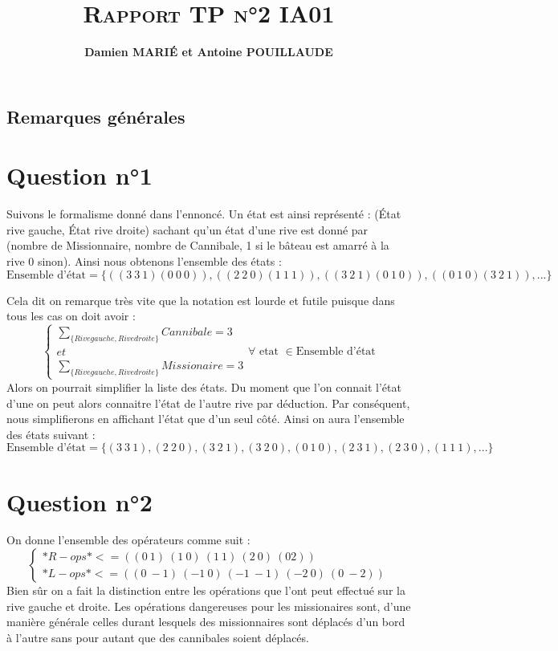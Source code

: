 \documentclass[a4paper, 12pt, leqno]{report}
\title{\textsc{\textbf{Rapport TP n°2 IA01}}}
\author{\textbf{Damien MARI\'E et Antoine POUILLAUDE}}
\theoremstyle{plain}
\begin{document}
    \maketitle
    \tableofcontents
\newpage
\section*{Remarques générales}
		
        \chapter{Question n°1}        
            Suivons le formalisme donné dans l'ennoncé. Un état est ainsi représenté : (État rive gauche, État rive droite) sachant qu'un état d'une rive est donné par (nombre de Missionnaire, nombre de Cannibale, 1 si le bâteau est amarré à la rive 0 sinon). Ainsi nous obtenons l'ensemble des états : 
            \[ \text{Ensemble d'état} = 
            \{ ((3\ 3\ 1) (0\ 0\ 0)),
            ((2\ 2\ 0) (1\ 1\ 1)),
            ((3\ 2\ 1) (0\ 1\ 0)),
            ((0\ 1\ 0) (3\ 2\ 1)),
            ...
            \}\]
            
    Cela dit on remarque très vite que la notation est lourde et futile puisque dans tous les cas on doit avoir : 
\[
          \left\{
    \begin{array}{ll}
        \sum_{\{Rive gauche,Rive droite\}}^{}Cannibale =3\\
        et\\
        \sum_{\{Rive gauche,Rive droite\}}^{}Missionaire = 3
    \end{array}
\right.
\forall \text{ etat } \in \text{Ensemble d'état}
\]
Alors on pourrait simplifier la liste des états. Du moment que l'on connait l'état d'une on peut alors connaitre l'état de l'autre rive par déduction. Par conséquent, nous simplifierons en affichant l'état que d'un seul côté. Ainsi on aura l'ensemble des états suivant :
\[ \text{Ensemble d'état} = 
            \{ (3\ 3\ 1),
            (2\ 2\ 0),
            (3\ 2\ 1),
            (3\ 2\ 0),
            (0\ 1\ 0),
            (2\ 3\ 1),
            (2\ 3\ 0),
            (1\ 1\ 1),
            ...
            \}\]

		\chapter{Question n°2}     
            On donne l'ensemble des opérateurs comme suit :
               $$
               \left\{
    \begin{array}{ll}
    *R-ops* <= ((0\ 1)\ (1\ 0)\ (1\ 1)\ (2\ 0)\ (0 2))\\     
                *L-ops* <= ((0\ -1)\ (-1\ 0)\ (-1\ -1)\ (-2\ 0)\ (0\ -2))
    \end{array}
    \right.
    $$
    Bien sûr on a fait la distinction entre les opérations que l'ont peut effectué sur la rive gauche et droite. Les opérations dangereuses pour les missionaires sont, d'une manière générale celles durant lesquels des missionnaires sont déplacés d'un bord à l'autre sans pour autant que des cannibales soient déplacés. 
        
\end{document}
